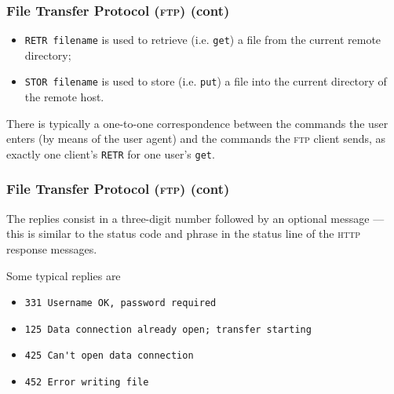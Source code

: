 %
\begin{frame}[containsverbatim]
\frametitle{File Transfer Protocol (\textsc{ftp}) (cont)}

\begin{itemize}

  \item \verb+RETR filename+ is used to retrieve (i.e. \texttt{get})
  a file from the current remote directory;

  \item \verb+STOR filename+ is used to store (i.e. \texttt{put}) a
  file into the current directory of the remote host.

\end{itemize}
There is typically a one-to-one correspondence between the commands
the user enters (by means of the user agent) and the commands the
\textsc{ftp} client sends, as exactly one client's \texttt{RETR} for
one user's \texttt{get}.

\end{frame}

%
\begin{frame}[containsverbatim]
\frametitle{File Transfer Protocol (\textsc{ftp}) (cont)}

The replies consist in a three-digit number followed by an optional
message --- this is similar to the status code and phrase in the
status line of the \textsc{http} response messages.

Some typical replies are
\begin{itemize}

  \item \verb+331 Username OK, password required+

  \item \verb+125 Data connection already open; transfer starting+

  \item \verb+425 Can't open data connection+

  \item \verb+452 Error writing file+

\end{itemize}

\end{frame}
